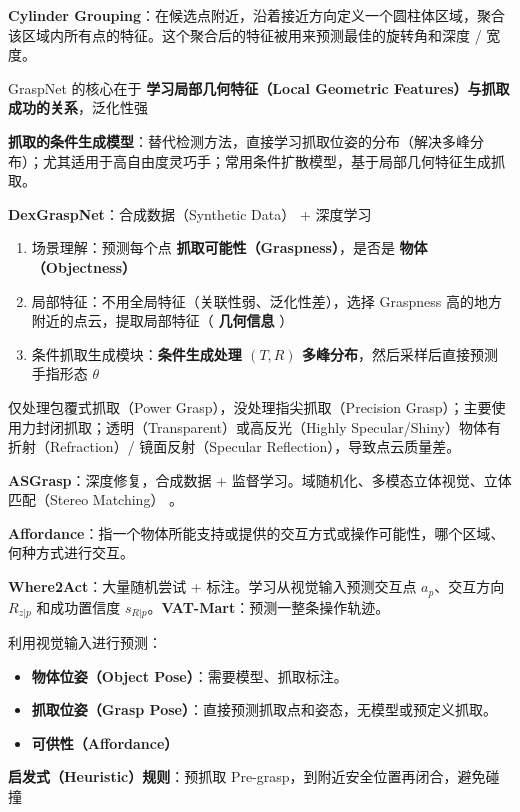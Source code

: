 \documentclass[
  8pt]{extarticle}
\providecommand{\tightlist}{%
  \setlength{\itemsep}{0pt}\setlength{\parskip}{0pt}}
\begin{document}
\begin{multicols*}{4}
\textbf{Cylinder
Grouping}：在候选点附近，沿着接近方向定义一个圆柱体区域，聚合该区域内所有点的特征。这个聚合后的特征被用来预测最佳的旋转角和深度
/ 宽度。

GraspNet 的核心在于 \textbf{学习局部几何特征（Local Geometric
Features）与抓取成功的关系}，泛化性强

\textbf{抓取的条件生成模型}：替代检测方法，直接学习抓取位姿的分布（解决多峰分布）；尤其适用于高自由度灵巧手；常用条件扩散模型，基于局部几何特征生成抓取。

\textbf{DexGraspNet}：合成数据（Synthetic Data） + 深度学习

\begin{enumerate}
\def\labelenumi{\arabic{enumi}.}
\tightlist
\item
  场景理解：预测每个点 \textbf{抓取可能性（Graspness）}，是否是
  \textbf{物体（Objectness）}
\item
  局部特征：不用全局特征（关联性弱、泛化性差），选择 Graspness
  高的地方附近的点云，提取局部特征（ \textbf{几何信息} ）
\item
  条件抓取生成模块：\textbf{条件生成处理 \((T, R)\)
  多峰分布}，然后采样后直接预测手指形态 \(\theta\)
\end{enumerate}

仅处理包覆式抓取（Power Grasp），没处理指尖抓取（Precision
Grasp）；主要使用力封闭抓取；透明（Transparent）或高反光（Highly
Specular/Shiny）物体有折射（Refraction）/ 镜面反射（Specular
Reflection），导致点云质量差。

\textbf{ASGrasp}：深度修复，合成数据 +
监督学习。域随机化、多模态立体视觉、立体匹配（Stereo Matching） 。

\textbf{Affordance}：指一个物体所能支持或提供的交互方式或操作可能性，哪个区域、何种方式进行交互。

\textbf{Where2Act}：大量随机尝试 + 标注。学习从视觉输入预测交互点
\(a_p\)、交互方向 \(R_{z|p}\) 和成功置信度
\(s_{R|p}\)。\textbf{VAT-Mart}：预测一整条操作轨迹。

利用视觉输入进行预测：

\begin{itemize}
\tightlist
\item
  \textbf{物体位姿（Object Pose）}：需要模型、抓取标注。
\item
  \textbf{抓取位姿（Grasp
  Pose）}：直接预测抓取点和姿态，无模型或预定义抓取。
\item
  \textbf{可供性（Affordance）}
\end{itemize}

\textbf{启发式（Heuristic）规则}：预抓取
Pre-grasp，到附近安全位置再闭合，避免碰撞


\end{multicols*}
\end{document}
